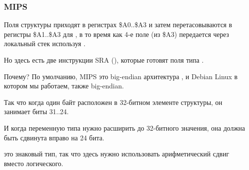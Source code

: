 \subsubsection{MIPS}
\label{MIPS_structure_big_endian}



Поля структуры приходят в регистрах \$A0..\$A3 и затем перетасовываются в регистры \$A1..\$A3 для \printf,
в то время как 4-е поле (из \$A3) передается через локальный стек используя .

Но здесь есть две инструкции SRA (), которые готовят поля типа \Tchar.

Почему?
По умолчанию, MIPS это big-endian архитектура , и Debian Linux в котором мы работаем, также big-endian.

Так что когда один байт расположен в 32-битном элементе структуры, он занимает биты 31..24.

И когда переменную типа \Tchar нужно расширить до 32-битного значения, она должна быть сдвинута вправо
на 24 бита.

\Tchar это знаковый тип, так что здесь нужно использовать арифметический сдвиг вместо логического.

